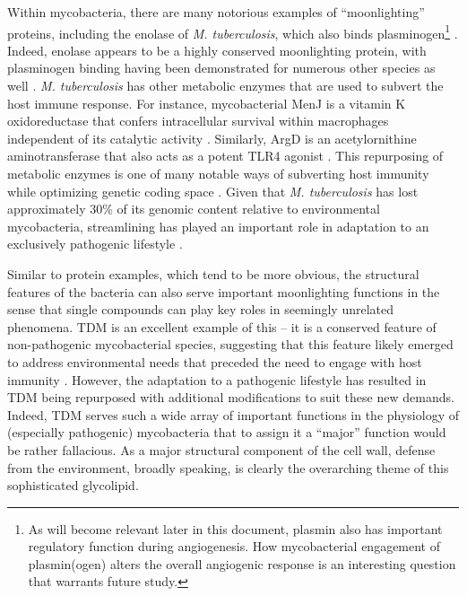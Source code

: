 Within mycobacteria, there are many notorious examples of ``moonlighting'' proteins, including the enolase of \textit{M. tuberculosis}, which also binds plasminogen\footnote{As will become relevant later in this document, plasmin also has important regulatory function during angiogenesis. How mycobacterial engagement of plasmin(ogen) alters the overall angiogenic response is an interesting question that warrants future study.} \citep{Rahi2017}. Indeed, enolase appears to be a highly conserved moonlighting protein, with plasminogen binding having been demonstrated for numerous other species as well \citep{Figueiredo2015, Seweryn2007, Candela2009, Floden2011, Vanegas2007, Agarwal2008}. \textit{M. tuberculosis} has other metabolic enzymes that are used to subvert the host immune response. For instance, mycobacterial MenJ is a vitamin K oxidoreductase that confers intracellular survival within macrophages independent of its catalytic activity \citep{Kumar2020b}. Similarly, ArgD is an acetylornithine aminotransferase that also acts as a potent TLR4 agonist \citep{Nehvi2022}. This repurposing of metabolic enzymes is one of many notable ways of subverting host immunity while optimizing genetic coding space \citep{Banerjee2004, Banerjee2007, Henderson2010}. Given that \textit{M. tuberculosis} has lost approximately 30\% of its genomic content relative to environmental mycobacteria, streamlining has played an important role in adaptation to an exclusively pathogenic lifestyle \citep{Stinear2008}. 

Similar to protein examples, which tend to be more obvious, the structural features of the bacteria can also serve important moonlighting functions in the sense that single compounds can play key roles in seemingly unrelated phenomena. TDM is an excellent example of this -- it is a conserved feature of non\hyp{}pathogenic mycobacterial species, suggesting that this feature likely emerged to address environmental needs that preceded the need to engage with host immunity \citep{Kremer2002, Pacheco2013}. However, the adaptation to a pathogenic lifestyle has resulted in TDM being repurposed with additional modifications to suit these new demands. Indeed, TDM serves such a wide array of important functions in the physiology of (especially pathogenic) mycobacteria that to assign it a ``major'' function would be rather fallacious. As a major structural component of the cell wall, defense from the environment, broadly speaking, is clearly the overarching theme of this sophisticated glycolipid. 


